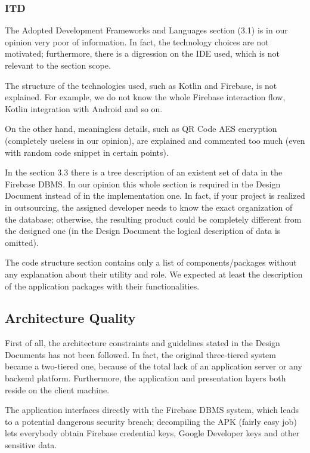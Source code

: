 \documentclass[table, 12pt]{article}
\begin{document}
\subsubsection{ITD}
The Adopted Development Frameworks and Languages section (3.1) is in our opinion very poor of information.
In fact, the technology choices are not motivated; furthermore, there is a digression on the IDE used, which is not relevant to the section scope.

The structure of the technologies used, such as Kotlin and Firebase, is not explained.
For example, we do not know the whole Firebase interaction flow, Kotlin integration with Android and so on.

On the other hand, meaningless details, such as QR Code AES encryption (completely useless in our opinion), are explained and commented too much (even with random code snippet in certain points).

In the section 3.3 there is a tree description of an existent set of data in the Firebase DBMS. In our opinion this whole section is required in the Design Document instead of in the implementation one. In fact, if your project is realized in outsourcing, the assigned developer needs to know the exact organization of the database; otherwise, the resulting product could be completely different from the designed one (in the Design Document the logical description of data is omitted).

The code structure section contains only a list of components/packages without any explanation about their utility and role. We expected at least the description of the application packages with their functionalities.

\subsection{Architecture Quality}
First of all, the architecture constraints and guidelines stated in the Design Documents has not been followed.
In fact, the original three-tiered system became a two-tiered one, because of the total lack of an application server or any backend platform. Furthermore, the application and presentation layers both reside on the client machine.

The application interfaces directly with the Firebase DBMS system, which leads to a potential dangerous security breach; decompiling the APK (fairly easy job) lets everybody obtain Firebase credential keys, Google Developer keys and other sensitive data.
\end{document}

